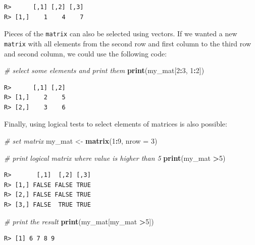\documentclass[
  12pt,
]{book}
\newenvironment{Shaded}{\begin{snugshade}}{\end{snugshade}}
\newcommand{\CommentTok}[1]{\textcolor[rgb]{0.37,0.37,0.37}{\textit{#1}}}
\newcommand{\DataTypeTok}[1]{\textcolor[rgb]{0.27,0.27,0.27}{#1}}
\newcommand{\DecValTok}[1]{\textcolor[rgb]{0.06,0.06,0.06}{#1}}
\newcommand{\KeywordTok}[1]{\textcolor[rgb]{0.27,0.27,0.27}{\textbf{#1}}}
\newcommand{\NormalTok}[1]{#1}
\newcommand{\OperatorTok}[1]{\textcolor[rgb]{0.43,0.43,0.43}{\textbf{#1}}}
\newcommand{\StringTok}[1]{\textcolor[rgb]{0.5,0.5,0.5}{#1}}
\begin{document}
\begin{verbatim}
R>      [,1] [,2] [,3]
R> [1,]    1    4    7
\end{verbatim}

Pieces of the \texttt{matrix} can also be selected using vectors. If we wanted a new \texttt{matrix} with all elements from the second row and first column to the third row and second column, we could use the following code:

\begin{Shaded}
\begin{Highlighting}[]
\CommentTok{# select some elements and print them}
\KeywordTok{print}\NormalTok{(my_mat[}\DecValTok{2}\OperatorTok{:}\DecValTok{3}\NormalTok{, }\DecValTok{1}\OperatorTok{:}\DecValTok{2}\NormalTok{])}
\end{Highlighting}
\end{Shaded}

\begin{verbatim}
R>      [,1] [,2]
R> [1,]    2    5
R> [2,]    3    6
\end{verbatim}

Finally, using logical tests to select elements of matrices is also possible: 

\begin{Shaded}
\begin{Highlighting}[]
\CommentTok{# set matrix}
\NormalTok{my_mat <-}\StringTok{ }\KeywordTok{matrix}\NormalTok{(}\DecValTok{1}\OperatorTok{:}\DecValTok{9}\NormalTok{, }\DataTypeTok{nrow =} \DecValTok{3}\NormalTok{)}

\CommentTok{# print logical matrix where value is higher than 5}
\KeywordTok{print}\NormalTok{(my_mat }\OperatorTok{>}\DecValTok{5}\NormalTok{)}
\end{Highlighting}
\end{Shaded}

\begin{verbatim}
R>       [,1]  [,2] [,3]
R> [1,] FALSE FALSE TRUE
R> [2,] FALSE FALSE TRUE
R> [3,] FALSE  TRUE TRUE
\end{verbatim}

\begin{Shaded}
\begin{Highlighting}[]
\CommentTok{# print the result}
\KeywordTok{print}\NormalTok{(my_mat[my_mat }\OperatorTok{>}\DecValTok{5}\NormalTok{])}
\end{Highlighting}
\end{Shaded}

\begin{verbatim}
R> [1] 6 7 8 9
\end{verbatim}
\end{document}
